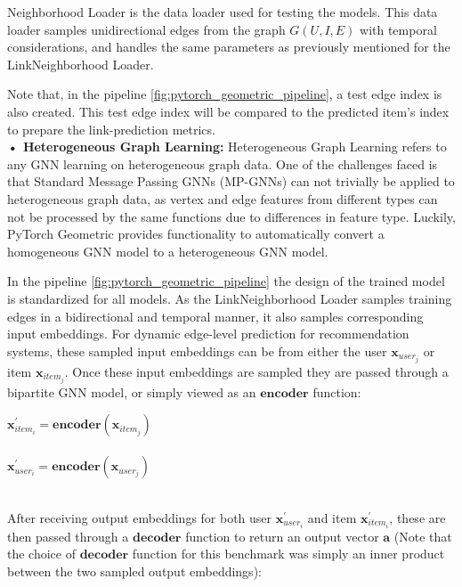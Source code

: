 \documentclass[bst/sn-nature]{sn-jnl}
\begin{document}
\begin{multicols}{2}
Neighborhood Loader\cite{sageconv} is the data loader used for testing the models. This data loader samples unidirectional edges from the graph $G(U,I,E)$ with temporal considerations, and handles the same parameters as previously mentioned for the LinkNeighborhood Loader.

Note that, in the pipeline \ref{fig:pytorch_geometric_pipeline}, a test edge index is also created. This test edge index will be compared to the predicted item’s index to prepare the link-prediction metrics. \\ 

\textbf{• Heterogeneous Graph Learning:} Heterogeneous Graph Learning refers to any GNN learning on heterogeneous graph data. One of the challenges faced is that Standard Message Passing GNNs (MP-GNNs) can not trivially be applied to heterogeneous graph data, as vertex and edge features from different types can not be processed by the same functions due to differences in feature type. Luckily, PyTorch Geometric provides functionality to automatically convert a homogeneous GNN model to a heterogeneous GNN model. 

In the pipeline \ref{fig:pytorch_geometric_pipeline} the design of the trained model is standardized for all models. As the LinkNeighborhood Loader samples training edges in a bidirectional and temporal manner, it also samples corresponding input embeddings. For dynamic edge-level prediction for recommendation systems, these sampled input embeddings can be from either the user $\mathbf{x}_{user_{j}}$ or item $\mathbf{x}_{item_{j}}$. Once these input embeddings are sampled they are passed through a bipartite GNN model, or simply viewed as an $\textbf{encoder}$ function: \\ 

\begin{center}
    $\mathbf{x}^{\prime}_{item_{i}} = \textbf{encoder}(\mathbf{x}_{item_{j}})$ \\~\\ 
    $\mathbf{x}^{\prime}_{user_{i}} = \textbf{encoder}(\mathbf{x}_{user_{j}})$ \\~\\
\end{center} 

After receiving output embeddings for both user $\mathbf{x}^{\prime}_{user_{i}}$ and item $\mathbf{x}^{\prime}_{item_{i}}$, these are then passed through a $\textbf{decoder}$ function to return an output vector $\mathbf{a}$  (Note that the choice of $\textbf{decoder}$ function for this benchmark was simply an inner product between the two sampled output embeddings): \\ 


\end{multicols}
\end{document}

